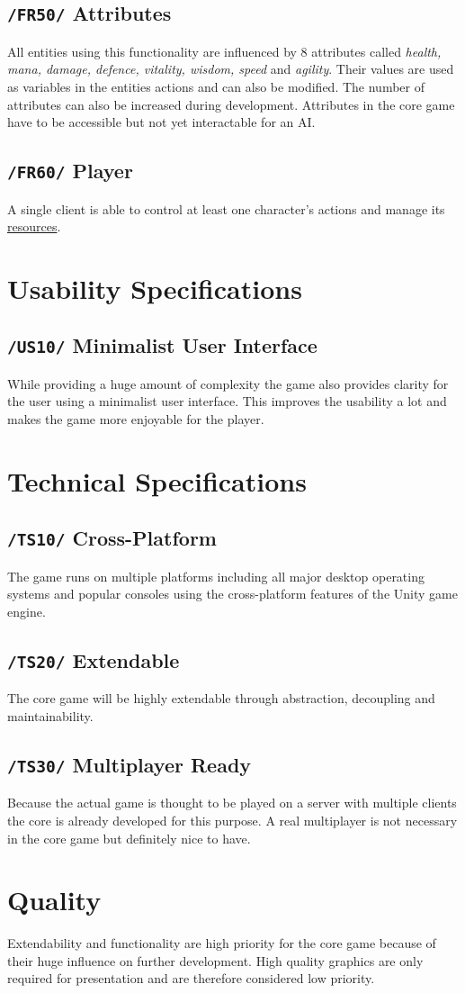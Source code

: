 \documentclass[11pt]{article}
\begin{document}
\subsection{\texttt{/FR50/} Attributes}\label{subsec:fs50attributes}
All entities using this functionality are influenced by 8 attributes called \textit{health, mana, damage, defence, vitality, wisdom, speed} and \textit{agility}. 
Their values are used as variables in the entities actions and can also be modified. The number of attributes can also be increased during development.
Attributes in the core game have to be accessible but not yet interactable for an AI.
\subsection{\texttt{/FR60/} Player}\label{subsec:fs60player}
A single client is able to control at least one character's actions and manage its \hyperref[subsec:fs40resources]{resources}.

\section{Usability Specifications}\label{sec:us}
\subsection{\texttt{/US10/} Minimalist User Interface}
While providing a huge amount of complexity the game also provides clarity for the user using a minimalist user interface. This improves the usability a lot and makes the game more enjoyable for the player.

\section{Technical Specifications}\label{sec:ts}
\subsection{\texttt{/TS10/} Cross-Platform}
The game runs on multiple platforms including all major desktop operating systems and popular consoles using the cross-platform features of the Unity game engine.
\subsection{\texttt{/TS20/} Extendable}
The core game will be highly extendable through abstraction, decoupling and maintainability.
\subsection{\texttt{/TS30/} Multiplayer Ready}
Because the actual game is thought to be played on a server with multiple clients the core is already developed for this purpose.
A real multiplayer is not necessary in the core game but definitely nice to have.

\section{Quality}
Extendability and functionality are high priority for the core game because of their huge influence on further development.
High quality graphics are only required for presentation and are therefore considered low priority.
\end{document}
